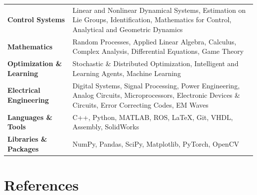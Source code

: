 \documentclass[10pt,letterpaper,sans]{moderncv}        %
\newcommand\x{1}
\begin{document}
\vspace{\x pt}
\begin{tabular}{p{4.2cm} p{12cm}}
    \textbf{Control Systems} & Linear and Nonlinear Dynamical Systems, Estimation on Lie Groups, Identification, Mathematics for Control, Analytical and Geometric Dynamics \\
    \textbf{Mathematics} & Random Processes, Applied Linear Algebra, Calculus, Complex Analysis, Differential Equations, Game Theory \\
    \textbf{Optimization \& Learning} & Stochastic \& Distributed Optimization, Intelligent and Learning Agents, Machine Learning\\
    \textbf{Electrical Engineering} & Digital Systems, Signal Processing, Power Engineering, Analog Circuits, Microprocessors, Electronic Devices \& Circuits, Error Correcting Codes, EM Waves\\
    \textbf{Languages \& Tools} &  C++, Python, MATLAB, ROS, \LaTeX, Git, VHDL, Assembly, SolidWorks\\
    \textbf{Libraries \& Packages} & NumPy, Pandas, SciPy, Matplotlib, PyTorch, OpenCV
\end{tabular}

\section{References} 
\end{document}
